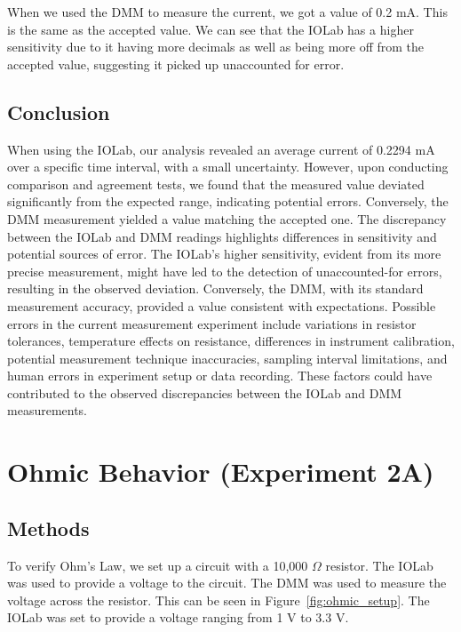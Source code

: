 \documentclass[11pt]{article}
\let\oldsection\section
\renewcommand\section{\clearpage\oldsection}
\begin{document}
\begin{e}
\begin{e}
    When we used the DMM to measure the current, we got a value of 0.2 mA. This is the same as the accepted value. We can see that the IOLab has a higher sensitivity due to it having more decimals as well as being more off from the accepted value, suggesting it picked up unaccounted for error.

    \subsection{Conclusion}\label{subsec:current_conclusion}

    When using the IOLab, our analysis revealed an average current of 0.2294 mA over a specific time interval, with a small uncertainty. However, upon conducting comparison and agreement tests, we found that the measured value deviated significantly from the expected range, indicating potential errors. Conversely, the DMM measurement yielded a value matching the accepted one. The discrepancy between the IOLab and DMM readings highlights differences in sensitivity and potential sources of error. The IOLab's higher sensitivity, evident from its more precise measurement, might have led to the detection of unaccounted-for errors, resulting in the observed deviation. Conversely, the DMM, with its standard measurement accuracy, provided a value consistent with expectations. Possible errors in the current measurement experiment include variations in resistor tolerances, temperature effects on resistance, differences in instrument calibration, potential measurement technique inaccuracies, sampling interval limitations, and human errors in experiment setup or data recording. These factors could have contributed to the observed discrepancies between the IOLab and DMM measurements.

    \section{Ohmic Behavior (Experiment 2A)}\label{sec:ohmic}

    \subsection{Methods}\label{subsec:ohmic_methods}

    To verify Ohm's Law, we set up a circuit with a 10,000 $\Omega$ resistor.
    The IOLab was used to provide a voltage to the circuit.
    The DMM was used to measure the voltage across the resistor.
    This can be seen in Figure~\ref{fig:ohmic_setup}.
    The IOLab was set to provide a voltage ranging from 1 V to 3.3 V.


\end{e}
\end{e}
\end{document}
